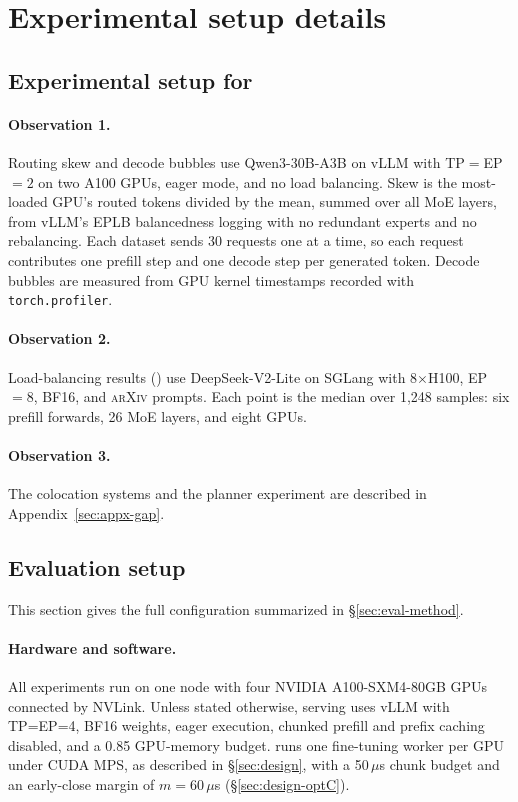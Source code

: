 \section{Experimental setup details}
\label{sec:appx-eval}

\subsection{Experimental setup for }
\label{sec:appx-setup-obs}

\paragraph{Observation 1.}
Routing skew and decode bubbles use Qwen3-30B-A3B on vLLM with
\ac{TP}$=$\ac{EP}$=2$ on two A100 GPUs, eager mode, and no load
balancing. Skew is the most-loaded GPU's routed tokens divided by the
mean, summed over all \ac{MoE} layers, from vLLM's EPLB balancedness
logging with no redundant experts and no rebalancing. Each dataset
sends 30 requests one at a time, so each request contributes one
prefill step and one decode step per generated token. Decode bubbles
are measured from GPU kernel timestamps recorded with
\texttt{torch.profiler}.

\paragraph{Observation 2.}
Load-balancing results () use DeepSeek-V2-Lite on
SGLang with 8$\times$H100, \ac{EP}$=8$, BF16, and \textsc{arXiv}
prompts. Each point is the median over 1,248 samples: six prefill
forwards, 26 \ac{MoE} layers, and eight GPUs.

\paragraph{Observation 3.}
The colocation systems and the planner experiment are described in
Appendix~\ref{sec:appx-gap}.

\subsection{Evaluation setup}
\label{sec:appx-setup}

This section gives the full configuration summarized in \S\ref{sec:eval-method}.

\paragraph{Hardware and software.}
All experiments run on one node with four NVIDIA A100-SXM4-80GB GPUs
connected by NVLink. Unless stated otherwise, serving uses vLLM with
\ac{TP}=\ac{EP}=4, BF16 weights, eager execution, chunked prefill and
prefix caching disabled, and a 0.85 GPU-memory budget. \sys{} runs one
fine-tuning worker per GPU under CUDA MPS, as described in
\S\ref{sec:design}, with a 50\,$\mu$s chunk budget and an early-close
margin of $m=60\,\mu$s (\S\ref{sec:design-optC}).


